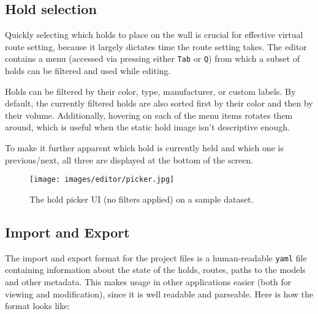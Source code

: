 \subsection{Hold selection}
Quickly selecting which holds to place on the wall is crucial for effective virtual route setting, because it largely dictates time the route setting takes.
The editor contains a menu (accessed via pressing either \verb|Tab| or \verb|Q|) from which a subset of holds can be filtered and used while editing.

Holds can be filtered by their color, type, manufacturer, or custom labels.
By default, the currently filtered holds are also sorted first by their color and then by their volume.
Additionally, hovering on each of the menu items rotates them around, which is useful when the static hold image isn't descriptive enough.

To make it further apparent which hold is currently held and which one is previous/next, all three are displayed at the bottom of the screen.

\begin{figure}[h]
	\centering
	\texttt{[image: images/editor/picker.jpg]}%
	\caption{The hold picker UI (no filters applied) on a sample dataset.}%
	\label{fig:picker}
\end{figure}

\subsection{Import and Export}
The import and export format for the project files is a human-readable \verb|yaml| file containing information about the state of the holds, routes, paths to the models and other metadata.
This makes usage in other applications easier (both for viewing and modification), since it is well readable and parseable.
Here is how the format looks like:

